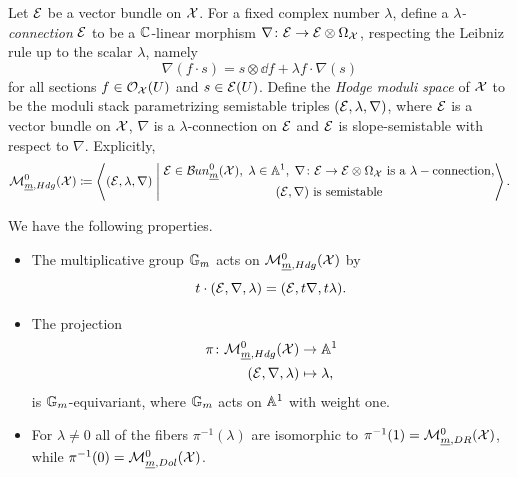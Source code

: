 \documentclass{article}
\begin{document}
\begin{defi}
Let $\mathcal{E}$ be a vector bundle on $\mathcal{X}$. For a fixed complex number $\lambda$, define a \textit{$\lambda$-connection} $\mathcal{E}$ to be a $\mathbb{C}$-linear morphism $\nabla\colon \mathcal{E} \to \mathcal{E} \otimes \Omega_{\mathcal{X}}$, respecting the Leibniz rule up to the scalar $\lambda$, namely
\[
\nabla(f \cdot s) = s \otimes \dd f + \lambda f \cdot \nabla(s)
\]
for all sections $f \in \mathcal{O}_{\mathcal{X}}(U)$ and $s \in \mathcal{E}(U)$.
Define the \textit{Hodge moduli space} of $\mathcal{X}$ to be the moduli stack parametrizing semistable triples $(\mathcal{E}, \lambda, \nabla)$, where $\mathcal{E}$ is a vector bundle on $\mathcal{X}$, $\nabla$ is a $\lambda$-connection on $\mathcal{E}$ and $\mathcal{E}$ is slope-semistable with respect to $\nabla$. Explicitly,
\begin{equation}
\mathcal{M}_{\underline{m}, Hdg}^0(\mathcal{X}) \coloneqq \left< (\mathcal{E}, \lambda, \nabla) \;\middle|\;
\begin{gathered}
\mathcal{E}\in \mathcal{B}\kern -.5pt un_{\underline{m}}^0(\mathcal{X}), \; \lambda \in \mathbb{A}^1, \; \nabla\colon \mathcal{E} \to \mathcal{E}\otimes \Omega_{\mathcal{X}} \text{ is a } \lambda-\text{connection}, \\
(\mathcal{E}, \nabla) \text{ is semistable}
\end{gathered}
\right>.
\end{equation}
\end{defi}

\begin{rmk}
We have the following properties.
\begin{itemize}
	\item The multiplicative group $\mathbb{G}_m$ acts on $\mathcal{M}_{\underline{m}, Hdg}^0(\mathcal{X})$ by
	\[
	t \cdot (\mathcal{E}, \nabla, \lambda) = (\mathcal{E}, t \nabla, t \lambda).
	\]
	\item The projection
    \begin{align}
	\pi\colon \mathcal{M}_{\underline{m}, Hdg}^0(\mathcal{X}) &\to \mathbb{A}^1 \\
	(\mathcal{E}, \nabla, \lambda) &\mapsto \lambda,
	\end{align}
    is $\mathbb{G}_m$-equivariant, where $\mathbb{G}_m$ acts on $\mathbb{A}^1$ with weight one.
	\item For $\lambda \neq 0$ all of the fibers $\pi^{-1}(\lambda)$ are isomorphic to $\pi^{-1}(1) = \mathcal{M}_{\underline{m}, DR}^0(\mathcal{X})$, while $\pi^{-1}(0)= \mathcal{M}_{\underline{m}, Dol}^0(\mathcal{X})$.
\end{itemize}
\end{rmk}
\end{document}
